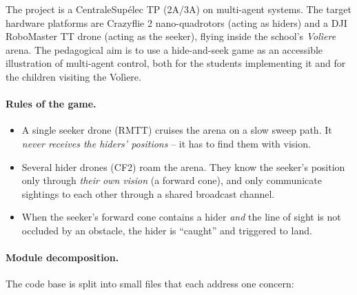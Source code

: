 \documentclass[11pt,a4paper]{article}
\begin{document}
The project is a CentraleSup\'elec TP (2A/3A) on multi-agent systems. The
target hardware platforms are Crazyflie 2 nano-quadrotors (acting as hiders)
and a DJI RoboMaster TT drone (acting as the seeker), flying inside the
school's \emph{Vol\`iere} arena. The pedagogical aim is to use a hide-and-seek
game as an accessible illustration of multi-agent control, both for the
students implementing it and for the children visiting the Vol\`iere.

\paragraph{Rules of the game.}
\begin{itemize}[leftmargin=1.4em]
  \item A single seeker drone (RMTT) cruises the arena on a slow sweep path.
        It \emph{never receives the hiders' positions} -- it has to find them
        with vision.
  \item Several hider drones (CF2) roam the arena. They know the seeker's
        position only through \emph{their own vision} (a forward cone), and
        only communicate sightings to each other through a shared broadcast
        channel.
  \item When the seeker's forward cone contains a hider \emph{and} the line
        of sight is not occluded by an obstacle, the hider is ``caught'' and
        triggered to land.
\end{itemize}

\paragraph{Module decomposition.}
The code base is split into small files that each address one concern:
\end{document}
